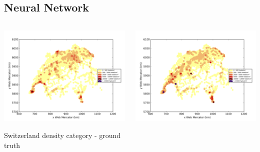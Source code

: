 \documentclass[c]{beamer}
\begin{document}
\subsection{Neural Network}
\begin{frame}
\tableofcontents[currentsubsection]
\end{frame}

\begin{frame}
\begin{columns}
 \begin{column}{0.5\textwidth}
  \begin{overlayarea}{\linewidth}{4cm}
    \centering\vfill
    \includegraphics[scale=0.50]{images/Switzerland/density_ground_truth.png}
  \end{overlayarea}
  \begin{overlayarea}{\linewidth}{0.5cm}
    \centering
    \tiny Switzerland density category - ground truth\par
  \end{overlayarea}
 \end{column}
 \begin{column}{0.5\textwidth}
  \begin{overlayarea}{\linewidth}{4cm}
    \centering\vfill
    \includegraphics[scale=0.50]{images/Switzerland/nn/density_classification.png}

\end{overlayarea}
\end{column}
\end{columns}
\end{frame}
\end{document}
